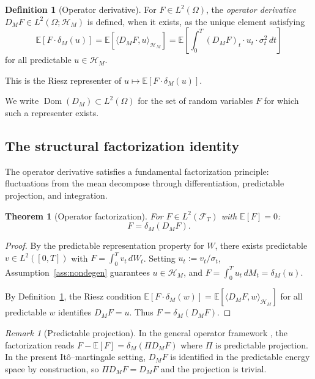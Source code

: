 \documentclass[11pt]{article}
\theoremstyle{plain}
\newtheorem{theorem}{Theorem}[section]
\theoremstyle{definition}
\newtheorem{definition}{Definition}[section]
\theoremstyle{remark}
\newtheorem{remark}{Remark}[section]
\newcommand{\E}{\mathbb{E}}
\newcommand{\F}{\mathcal{F}}
\newcommand{\HH}{\mathcal{H}}
\newcommand{\ip}[2]{\langle #1, #2 \rangle}
\DeclareMathOperator{\Dom}{Dom}
\begin{document}
\begin{definition}[Operator derivative]\label{def:operator-deriv}
For $F \in L^2(\Omega)$, the \emph{operator derivative} $D_M F \in L^2(\Omega; \HH_M)$ 
is defined, when it exists, as the unique element satisfying
\begin{equation}\label{eq:riesz}
\E[F \cdot \delta_M(u)] = \E[\ip{D_M F}{u}_{\HH_M}] = \E\left[\int_0^T (D_M F)_t \cdot u_t \cdot \sigma_t^2\,dt\right]
\end{equation}
for all predictable $u \in \HH_M$.
\end{definition}

This is the Riesz representer of $u \mapsto \E[F \cdot \delta_M(u)]$.

We write $\Dom(D_M) \subset L^2(\Omega)$ for the set of random variables $F$ 
for which such a representer exists.

\subsection{The structural factorization identity}

The operator derivative satisfies a fundamental factorization principle: 
fluctuations from the mean decompose through differentiation, predictable 
projection, and integration.

\begin{theorem}[Operator factorization]\label{thm:factorization}
For $F \in L^2(\F_T)$ with $\E[F] = 0$:
\begin{equation}\label{eq:factorization}
F = \delta_M(D_M F).
\end{equation}
\end{theorem}

\begin{proof}
By the predictable representation property for $W$, there exists predictable 
$v \in L^2([0,T])$ with $F = \int_0^T v_t\,dW_t$. Setting $u_t := v_t/\sigma_t$, 
Assumption~\ref{ass:nondegen} guarantees $u \in \HH_M$, and 
$F = \int_0^T u_t\,dM_t = \delta_M(u)$.

By Definition~\ref{def:operator-deriv}, the Riesz condition 
$\E[F \cdot \delta_M(w)] = \E[\ip{D_M F}{w}_{\HH_M}]$ for all predictable $w$ 
identifies $D_M F = u$. Thus $F = \delta_M(D_M F)$.
\end{proof}

\begin{remark}[Predictable projection]
In the general operator framework \cite{Fontes2026a}, the factorization reads 
$F - \E[F] = \delta_M(\Pi D_M F)$ where $\Pi$ is predictable projection. In the 
present It\^o--martingale setting, $D_M F$ is identified in the predictable 
energy space by construction, so $\Pi D_M F = D_M F$ and the projection is trivial.
\end{remark}
\end{document}
